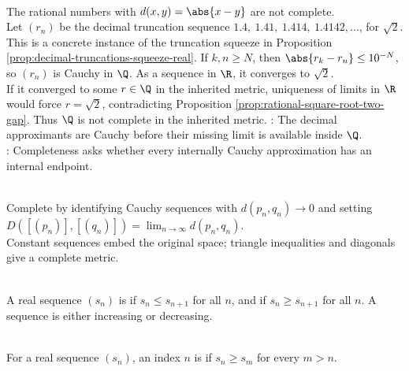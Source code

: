 \begin{example} \label{ex:rational-metric-not-complete} \\
The rational numbers with $d(x,y)=\abs{x-y}$ are not complete.\\
Let $(r_n)$ be the decimal truncation sequence $1.4,\ 1.41,\ 1.414,\ 1.4142,\ldots$, for $\sqrt{2}$.\\
This is a concrete instance of the truncation squeeze in Proposition \ref{prop:decimal-truncations-squeeze-real}. If $k,n\geq N$, then $\abs{r_k-r_n}\leq10^{-N}$, so $(r_n)$ is Cauchy in $\Q$. As a sequence in $\R$, it converges to $\sqrt{2}$.\\
If it converged to some $r\in\Q$ in the inherited metric, uniqueness of limits in $\R$ would force $r=\sqrt{2}$, contradicting Proposition \ref{prop:rational-square-root-two-gap}. Thus $\Q$ is not complete in the inherited metric.
: The decimal approximants are Cauchy before their missing limit is available inside $\Q$.\\
: Completeness asks whether every internally Cauchy approximation has an internal endpoint.
\end{example}

\begin{perspective} \label{per:cauchy-completion-skeleton} \\
Complete by identifying Cauchy sequences with $d(p_n,q_n)\to0$ and setting $D([(p_n)],[(q_n)])=\lim_{n\to\infty}d(p_n,q_n)$.\\
Constant sequences embed the original space; triangle inequalities and diagonals give a complete metric.
\end{perspective}

\begin{definition} \label{def:monotone-sequence} \\
A real sequence $(s_n)$ is  if $s_n\leq s_{n+1}$ for all $n$, and  if $s_n\geq s_{n+1}$ for all $n$. A  sequence is either increasing or decreasing.
\end{definition}

\begin{definition} \label{def:dominant-index} \\
For a real sequence $(s_n)$, an index $n$ is  if $s_n\geq s_m$ for every $m>n$.
\end{definition}

